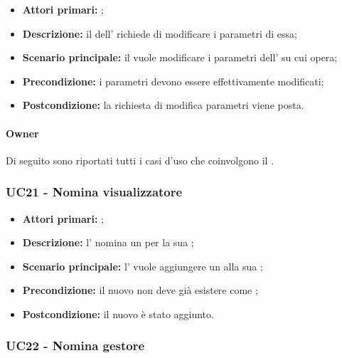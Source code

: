 \documentclass[casi-duso]{subfiles}
\begin{document}
\begin{itemize}
  \item \textbf{Attori primari:} ;
  \item \textbf{Descrizione:} il  dell' richiede di modificare i parametri di essa;
  \item \textbf{Scenario principale:} il  vuole modificare i parametri dell' su cui opera;
  \item \textbf{Precondizione:} i parametri devono essere effettivamente modificati;
  \item \textbf{Postcondizione:} la richiesta di modifica parametri viene posta.

\end{itemize}

\paragraph{Owner}
Di seguito sono riportati tutti i casi d'uso che coinvolgono il  .

\subsubsection{UC21 - Nomina visualizzatore}
\label{subsub:UC21}

\begin{itemize}
  \item \textbf{Attori primari:} ;
  \item \textbf{Descrizione:} l'  nomina un  per la sua ;
  \item \textbf{Scenario principale:} l'  vuole aggiungere un  alla sua ;
  \item \textbf{Precondizione:} il nuovo  non deve già esistere come ;
  \item \textbf{Postcondizione:} il nuovo  è stato aggiunto.

\end{itemize}


\subsubsection{UC22 - Nomina gestore}
\label{subsub:UC22}
\end{document}
